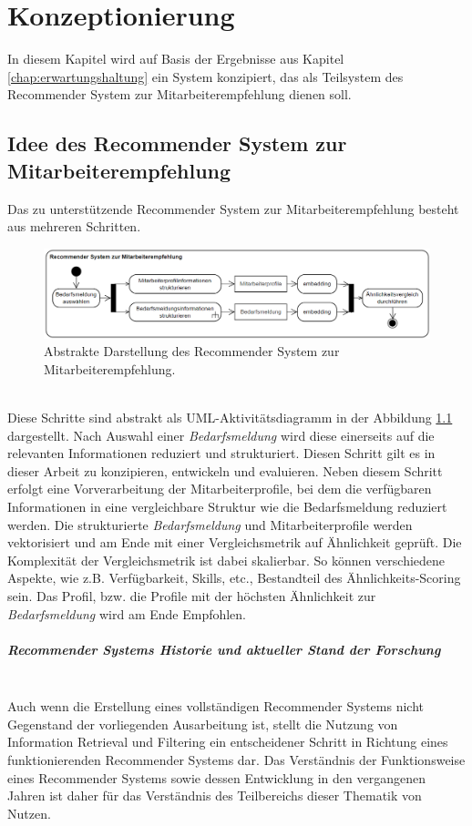 \chapter{Konzeptionierung}
\label{chap:konzeption}
In diesem Kapitel wird auf Basis der Ergebnisse aus Kapitel \ref{chap:erwartungshaltung} ein System konzipiert, das als Teilsystem des Recommender System zur Mitarbeiterempfehlung dienen soll.
\section{Idee des Recommender System zur Mitarbeiterempfehlung}
Das zu unterstützende Recommender System zur Mitarbeiterempfehlung besteht aus mehreren Schritten.
\begin{figure}[H]
	\centering  
	\includegraphics[width=\linewidth]{Abbildungen/recommendersystem.png}
	\caption{Abstrakte Darstellung des Recommender System zur Mitarbeiterempfehlung.}
	\label{fig:recommendersystem}
\end{figure}\mbox{} \\
Diese Schritte sind abstrakt als UML-Aktivitätsdiagramm in der Abbildung \ref{fig:recommendersystem} dargestellt. Nach Auswahl einer \emph{Bedarfsmeldung} wird diese einerseits auf die relevanten Informationen reduziert und strukturiert. Diesen Schritt gilt es in dieser Arbeit zu konzipieren, entwickeln und evaluieren. Neben diesem Schritt erfolgt eine Vorverarbeitung der Mitarbeiterprofile, bei dem die verfügbaren Informationen in eine vergleichbare Struktur wie die Bedarfsmeldung reduziert werden. Die strukturierte \emph{Bedarfsmeldung} und Mitarbeiterprofile werden vektorisiert und am Ende mit einer Vergleichsmetrik auf Ähnlichkeit geprüft. Die Komplexität der Vergleichsmetrik ist dabei skalierbar. So können verschiedene Aspekte, wie z.B. Verfügbarkeit, Skills, etc., Bestandteil des Ähnlichkeits-Scoring sein. Das Profil, bzw. die Profile mit der höchsten Ähnlichkeit zur \emph{Bedarfsmeldung} wird am Ende Empfohlen.
\paragraph{Recommender Systems Historie und aktueller Stand der Forschung}\mbox{} \\
Auch wenn die Erstellung eines vollständigen Recommender Systems nicht Gegenstand der vorliegenden Ausarbeitung ist, stellt die Nutzung von Information Retrieval und Filtering ein entscheidener Schritt in Richtung eines funktionierenden Recommender Systems dar. Das Verständnis der Funktionsweise eines Recommender Systems sowie dessen Entwicklung in den vergangenen Jahren ist daher für das Verständnis des Teilbereichs dieser Thematik von Nutzen.\\

